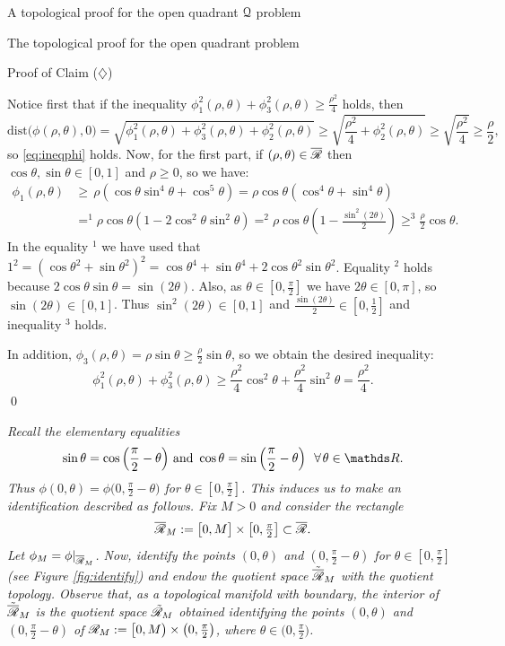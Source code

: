 \documentclass[11pt, a4paper, english, twoside, notitlepage, openright]{report}
\begin{document}
\begin{chapter}{A topological proof for the open quadrant $\mathcal{Q}$ problem}
\begin{section}{The topological proof for the open quadrant problem}
\begin{subsection}{Proof of Claim ($\diamondsuit$)}
\begin{lemma}
\begin{Proof}
Notice first that if the inequality $\phi_1^2(\rho,\theta)+\phi_3^2(\rho,\theta)\ge\frac{\rho^2}{4}$ holds, then
$$
\text{dist}\big(\phi(\rho,\theta),0\big)=\sqrt{\phi_1^2(\rho,\theta)+\phi_3^2(\rho,\theta) + \phi_2^2(\rho,\theta)}\ge\sqrt{\frac{\rho^2}{4} + \phi_2^2(\rho,\theta)}\ge\sqrt{\frac{\rho^2}{4}}\ge\frac{\rho}{2},
$$
so \ref{eq:ineqphi} holds. Now, for the first part, if $(\rho,\theta)\in\overline{\mathscr{R}}$ then $\cos\theta, \sin\theta \in[0,1]$ and $\rho\ge0$, so we have:
\begin{align*}
\phi_1(\rho,\theta)&\ge\,\rho(\cos\theta\sin^4\theta+\cos^5\theta)=\rho\cos\theta(\cos^4\theta+\sin^4\theta)\\
&=^1\rho\cos\theta(1-2\cos^2\theta\sin^2\theta)=^2\rho\cos\theta\left(1-\frac{\sin^2(2\theta)}{2}\right)
\ge^3 \frac{\rho}{2}\cos\theta.
\end{align*}
In the equality $^1$ we have used that $1^2=(\cos\theta^2+\sin\theta^2)^2=\cos\theta^4+\sin\theta^4+2\cos\theta^2\sin\theta^2$. Equality $^2$ holds because $2\cos\theta\sin\theta=\sin(2\theta)$. Also, as $\theta\in[0,\tfrac{\pi}{2}]$ we have $2\theta\in[0,\pi]$, so $\sin(2\theta)\in[0,1]$. Thus $\sin^2(2\theta)\in[0,1]$ and $\tfrac{\sin(2\theta)}{2}\in[0,\tfrac{1}{2}]$ and inequality $^3$ holds.

\vspace{1mm}

In addition, $\phi_3(\rho,\theta)=\rho\sin\theta\ge\frac{\rho}{2}\sin\theta$, so we obtain the desired inequality:
$$
\phi_1^2(\rho,\theta)+\phi_3^2(\rho,\theta)\ge \frac{\rho^2}{4}\cos^2\theta+\frac{\rho^2}{4}\sin^2\theta=\frac{\rho^2}{4}.
$$
\qed
\end{Proof}
\end{lemma}

\begin{constr}\label{quotConstr}
\em
Recall the elementary equalities
$$
\sin\theta=\cos\Big(\frac{\pi}{2}-\theta\Big)\text{ and } \cos\theta=\sin\Big(\frac{\pi}{2}-\theta\Big)\ \ \forall\theta\in\R.
$$
Thus $\phi(0,\theta)=\phi\big(0,\tfrac{\pi}{2}-\theta\big)$ for $\theta\in[0,\tfrac{\pi}{2}]$. This induces us to make an identification described as follows. Fix $M>0$ and consider the rectangle 
$$
\overline{\mathscr{R}}_M:=\big[0,M\big]\times\big[0,\tfrac{\pi}{2}\big]\subset\overline{\mathscr{R}}.
$$
Let $\phi_M=\phi|_{\overline{\mathscr{R}}_M}$. Now, identify the points $(0,\theta)$ and $(0,\frac{\pi}{2}-\theta)$ for $\theta\in[0,\tfrac{\pi}{2}]$ (see Figure \ref{fig:identify}) and endow the quotient space $\tilde{\overline{\mathscr{R}}}_M$ with the quotient topology. Observe that, as a topological manifold with boundary, the interior of $\tilde{\overline{\mathscr{R}}}_M$ is the quotient space $\tilde{\mathscr{R}}_M$ obtained identifying the points $(0,\theta)$ and $(0,\frac{\pi}{2}-\theta)$ of $\mathscr{R}_M:=\big[0,M\big)\times\big(0,\tfrac{\pi}{2}\big)$, where $\theta\in\big(0,\tfrac{\pi}{2}\big)$.


\end{constr}
\end{subsection}
\end{section}
\end{chapter}
\end{document}
